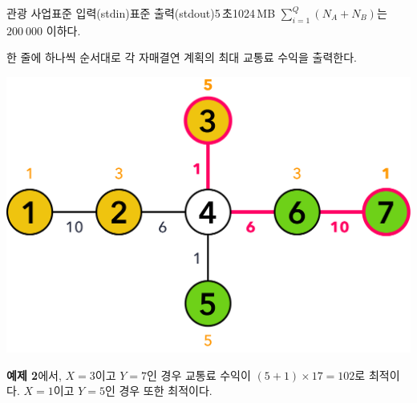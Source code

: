 \begin{problem}{관광 사업}{표준 입력(stdin)}{표준 출력(stdout)}{5\,초}{1024\,MB}
$\sum_{i=1}^{Q} (N_A+N_B)$는 $200\ 000$ 이하다.

\OutputFile
한 줄에 하나씩 순서대로 각 자매결연 계획의 최대 교통료 수익을 출력한다.

\Examples

\begin{example}
%
%
\end{example}
\Note
\begin{center}
    \includegraphics[width=.525\textwidth]{../pictures/tour@4x.png}
\end{center}
\textbf{예제 2}에서, $X=3$이고 $Y=7$인 경우 교통료 수익이 $(5+1) \times 17=102$로 최적이다. $X=1$이고 $Y=5$인 경우 또한 최적이다.
\end{problem}